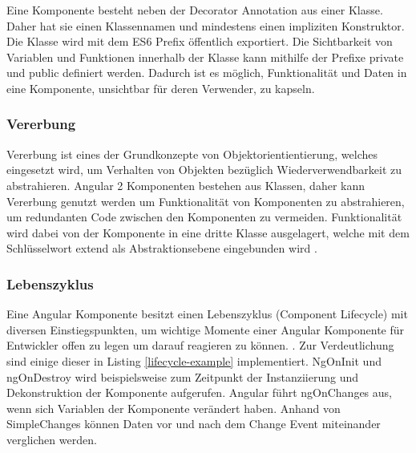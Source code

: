 Eine Komponente besteht neben der Decorator Annotation aus einer Klasse.
Daher hat sie einen Klassennamen und mindestens einen impliziten Konstruktor.
Die Klasse wird mit dem ES6 Prefix öffentlich exportiert. Die Sichtbarkeit von Variablen und Funktionen
innerhalb der Klasse kann mithilfe der Prefixe private und public definiert werden.
Dadurch ist es möglich, Funktionalität und Daten in eine Komponente, unsichtbar für deren Verwender, zu kapseln.

\vspace{0.3cm}

\vspace{0.3cm}


\subsubsection{Vererbung}

Vererbung ist eines der Grundkonzepte von Objektorientientierung,
welches eingesetzt wird, um Verhalten von Objekten bezüglich Wiederverwendbarkeit zu
abstrahieren. Angular 2 Komponenten bestehen aus Klassen, daher
kann Vererbung genutzt werden um Funktionalität von Komponenten zu abstrahieren,
um redundanten Code zwischen den Komponenten
zu vermeiden. Funktionalität wird dabei von der Komponente in eine dritte Klasse ausgelagert,
welche mit dem Schlüsselwort extend als
Abstraktionsebene eingebunden wird \cite{DanWa45:online}.

\subsubsection{Lebenszyklus}
Eine Angular Komponente besitzt einen Lebenszyklus (Component Lifecycle) mit diversen Einstiegspunkten,
um wichtige Momente einer Angular Komponente für Entwickler offen zu legen um darauf reagieren zu können. \cite[837-839]{ng-Book-2}.
Zur Verdeutlichung sind einige dieser in Listing \ref{lifecycle-example} implementiert.
NgOnInit und ngOnDestroy wird beispielsweise zum Zeitpunkt der Instanziierung und Dekonstruktion der Komponente aufgerufen.
Angular führt ngOnChanges aus, wenn sich Variablen der Komponente verändert haben. Anhand von SimpleChanges
können Daten vor und nach dem Change Event miteinander verglichen werden.

\vspace{0.3cm}

\vspace{0.3cm}




